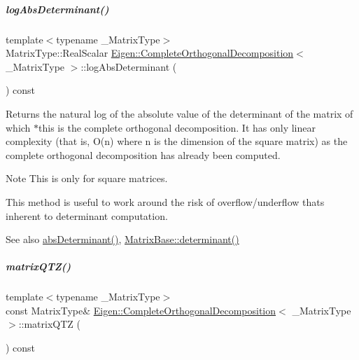 \mbox{\label{group___q_r___module_a5b38f6d1938b3d08376898b24fa39a0a}} 
\subparagraph{\texorpdfstring{log\+Abs\+Determinant()}{logAbsDeterminant()}\hspace{0.1cm}{\footnotesize\ttfamily [2/2]}}
{\footnotesize\ttfamily template$<$typename \+\_\+\+Matrix\+Type$>$ \\
Matrix\+Type\+::\+Real\+Scalar \hyperlink{group___q_r___module_class_eigen_1_1_complete_orthogonal_decomposition}{Eigen\+::\+Complete\+Orthogonal\+Decomposition}$<$ \+\_\+\+Matrix\+Type $>$\+::log\+Abs\+Determinant (\begin{DoxyParamCaption}{ }\end{DoxyParamCaption}) const}

\begin{DoxyReturn}{Returns}
the natural log of the absolute value of the determinant of the matrix of which $\ast$this is the complete orthogonal decomposition. It has only linear complexity (that is, O(n) where n is the dimension of the square matrix) as the complete orthogonal decomposition has already been computed.
\end{DoxyReturn}
\begin{DoxyNote}{Note}
This is only for square matrices.

This method is useful to work around the risk of overflow/underflow that\textquotesingle{}s inherent to determinant computation.
\end{DoxyNote}
\begin{DoxySeeAlso}{See also}
\hyperlink{group___q_r___module_ac040c34ce3fb2b68d3f57adc0c29d526}{abs\+Determinant()}, \hyperlink{group___core___module_a7ad8f77004bb956b603bb43fd2e3c061}{Matrix\+Base\+::determinant()} 
\end{DoxySeeAlso}
\mbox{\label{group___q_r___module_ad89e2529fc1a8721239d9b6be9613a69}} 
\subparagraph{\texorpdfstring{matrix\+Q\+T\+Z()}{matrixQTZ()}\hspace{0.1cm}{\footnotesize\ttfamily [1/2]}}
{\footnotesize\ttfamily template$<$typename \+\_\+\+Matrix\+Type$>$ \\
const Matrix\+Type\& \hyperlink{group___q_r___module_class_eigen_1_1_complete_orthogonal_decomposition}{Eigen\+::\+Complete\+Orthogonal\+Decomposition}$<$ \+\_\+\+Matrix\+Type $>$\+::matrix\+Q\+TZ (\begin{DoxyParamCaption}{ }\end{DoxyParamCaption}) const\hspace{0.3cm}{\ttfamily [inline]}}

